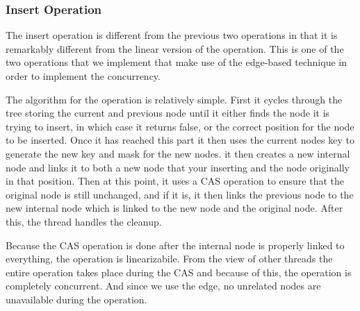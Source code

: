\documentclass[conference]{IEEEtran}
\begin{document}
\subsubsection{Insert Operation}
The insert operation is different from the previous two operations in that it is remarkably different from the linear version of the operation. This is one of the two operations that we implement that make use of the edge-based technique in order to implement the concurrency.
\par
The algorithm for the operation is relatively simple. First it cycles through the tree storing the current and previous node until it either finds the node it is trying to insert, in which case it returns false, or the correct position for the node to be inserted. Once it has reached this part it then uses the current nodes key to generate the new key and mask for the new nodes. it then creates a new internal node and links it to both a new node that your inserting and the node originally in that position. Then at this point, it uses a CAS operation to ensure that the original node is still unchanged, and if it is, it then links the previous node to the new internal node which is linked to the new node and the original node. After this, the thread handles the cleanup.
\par
Because the CAS operation is done after the internal node is properly linked to everything, the operation is linearizabile. From the view of other threads the entire operation takes place during the CAS and because of this, the operation is completely concurrent. And since we use the edge, no unrelated nodes are unavailable during the operation.
\end{document}
